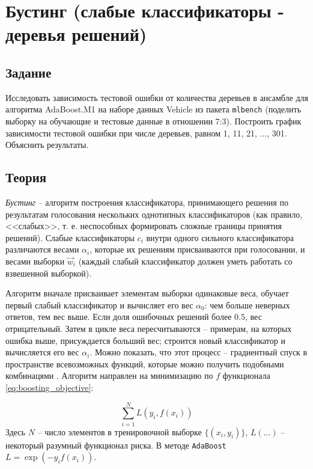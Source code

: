 \documentclass[a4paper,12pt]{article} %
\begin{document}


\section{Бустинг (слабые классификаторы - деревья решений)}
\subsection{Задание}
Исследовать зависимость тестовой ошибки от количества деревьев в ансамбле для алгоритма AdaBoost.M1 на наборе данных Vehicle из пакета \texttt{mlbench} (поделить выборку на обучающие и тестовые данные в отношении 7:3). Построить график зависимости тестовой ошибки при числе деревьев, равном 1, 11, 21, ..., 301. Объяснить результаты.

\subsection{Теория}\label{section:boosting_theory}

\textit{Бустинг} -- алгоритм построения классификатора, принимающего решения по результатам голосования нескольких однотипных классификаторов (как правило, <<слабых>>, т. е. неспособных формировать сложные границы принятия решений). Слабые классификаторы $c_i$ внутри одного сильного классификатора различаются весами $\alpha_i$, которые их решениям присваиваются при голосовании, и весами выборки $\vec{w}_i$ (каждый слабый классификатор должен уметь работать со взвешенной выборкой).

Алгоритм вначале присваивает элементам выборки одинаковые веса, обучает первый слабый классификатор и вычисляет его вес $\alpha_0$: чем больше неверных ответов, тем вес выше. Если доля ошибочных решений более $0.5$, вес отрицательный. Затем в цикле веса пересчитываются -- примерам, на которых ошибка выше, присуждается больший вес; строится новый классификатор и вычисляется его вес $\alpha_i$. Можно показать, что этот процесс -- градиентный спуск в пространстве всевозможных функций, которые можно получить подобными комбинацями \cite{murphy}. Алгоритм направлен на минимизацию по $f$ функционала \eqref{eq:boosting_objective}:

\begin{equation} \label{eq:boosting_objective}
	\sum_{i=1}^{N} L(y_i, f(x_i))
\end{equation}
Здесь $N$ -- число элементов в тренировочной выборке $\{(x_i, y_i)\}$, $L(...)$ -- некоторый разумный функционал риска. В методе \texttt{AdaBoost} $L = \exp(-y_i f(x_i))$.
\end{document}
